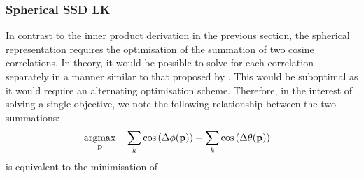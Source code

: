 \subsubsection{Spherical SSD LK}\label{subsubsec:lk-spherical}
In contrast to the inner product derivation in the previous section, the
spherical representation requires the optimisation of the summation of two
cosine correlations. In theory, it would be possible to solve for each
correlation separately in a manner similar to that proposed
by \citet{tzimiropoulos2011robust}. This would be suboptimal as it would require an
alternating optimisation scheme. Therefore, in the interest of solving a single 
objective, we note the following relationship between the two summations:
\begin{equation}
    \begin{aligned}\label{eq:argmax_spherical}
        \argmax_{\p} \quad &\sum_k \cos{\left(\Delta \phi(\p)\right)} + \sum_k \cos{\left(\Delta \theta(\p)\right)}
    \end{aligned}
\end{equation}
is equivalent to the minimisation of
